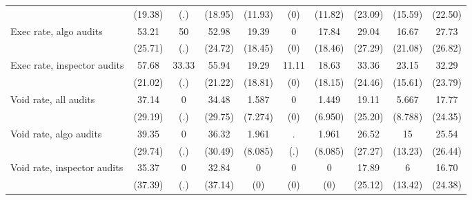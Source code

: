{\begin{tabular}{l*{9}{c}}
            &     (19.38)         &         (.)         &     (18.95)         &     (11.93)         &         (0)         &     (11.82)         &     (23.09)         &     (15.59)         &     (22.50)         \\
Exec rate, algo audits&       53.21         &          50         &       52.98         &       19.39         &           0         &       17.84         &       29.04         &       16.67         &       27.73         \\
            &     (25.71)         &         (.)         &     (24.72)         &     (18.45)         &         (0)         &     (18.46)         &     (27.29)         &     (21.08)         &     (26.82)         \\
Exec rate, inspector audits&       57.68         &       33.33         &       55.94         &       19.29         &       11.11         &       18.63         &       33.36         &       23.15         &       32.29         \\
            &     (21.02)         &         (.)         &     (21.22)         &     (18.81)         &         (0)         &     (18.15)         &     (24.46)         &     (15.61)         &     (23.79)         \\
Void rate, all audits&       37.14         &           0         &       34.48         &       1.587         &           0         &       1.449         &       19.11         &       5.667         &       17.77         \\
            &     (29.19)         &         (.)         &     (29.75)         &     (7.274)         &         (0)         &     (6.950)         &     (25.20)         &     (8.788)         &     (24.35)         \\
Void rate, algo audits&       39.35         &           0         &       36.32         &       1.961         &           .         &       1.961         &       26.52         &          15         &       25.54         \\
            &     (29.74)         &         (.)         &     (30.49)         &     (8.085)         &         (.)         &     (8.085)         &     (27.27)         &     (13.23)         &     (26.44)         \\
Void rate, inspector audits&       35.37         &           0         &       32.84         &           0         &           0         &           0         &       17.89         &           6         &       16.70         \\
            &     (37.39)         &         (.)         &     (37.14)         &         (0)         &         (0)         &         (0)         &     (25.12)         &     (13.42)         &     (24.38)         \\

\end{tabular}}

